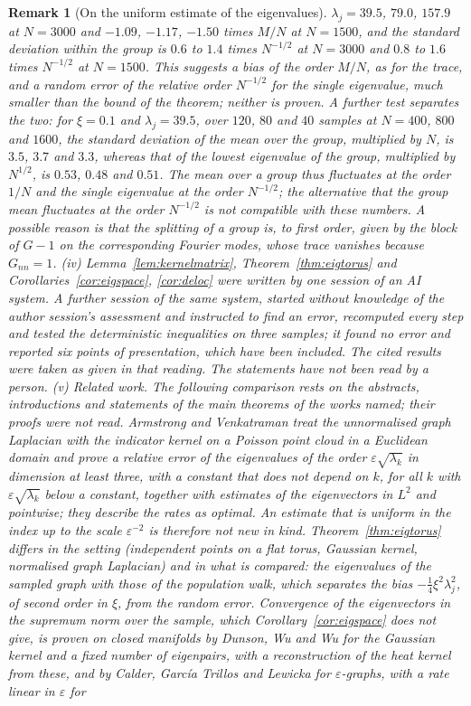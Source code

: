 \documentclass[11pt,a4paper]{article}
\theoremstyle{stmt}
\theoremstyle{defn}
\theoremstyle{rmk}
\newtheorem{remark}[theorem]{Remark}
\numberwithin{equation}{section}
\begin{document}
{\begin{remark}[On the uniform estimate of the eigenvalues]
$\lambda_j=39.5$, $79.0$, $157.9$ at $N=3000$ and $-1.09$, $-1.17$, $-1.50$ times $M/N$ at $N=1500$, and the standard deviation within the group is $0.6$ to $1.4$ times $N^{-1/2}$ at $N=3000$ and $0.8$ to $1.6$ times $N^{-1/2}$ at $N=1500$. This suggests a bias of the order $M/N$, as for the trace, and a random error of the relative order $N^{-1/2}$ for the single eigenvalue, much smaller than the bound of the theorem; neither is proven. A further test separates the two: for $\xi=0.1$ and $\lambda_j=39.5$, over $120$, $80$ and $40$ samples at $N=400$, $800$ and $1600$, the standard deviation of the mean over the group, multiplied by $N$, is $3.5$, $3.7$ and $3.3$, whereas that of the lowest eigenvalue of the group, multiplied by $N^{1/2}$, is $0.53$, $0.48$ and $0.51$. The mean over a group thus fluctuates at the order $1/N$ and the single eigenvalue at the order $N^{-1/2}$; the alternative that the group mean fluctuates at the order $N^{-1/2}$ is not compatible with these numbers. A possible reason is that the splitting of a group is, to first order, given by the block of $G-1$ on the corresponding Fourier modes, whose trace vanishes because $G_{nn}=1$. (iv) Lemma~\ref{lem:kernelmatrix}, Theorem~\ref{thm:eigtorus} and Corollaries~\ref{cor:eigspace}, \ref{cor:deloc} were written by one session of an AI system. A further session of the same system, started without knowledge of the author session's assessment and instructed to find an error, recomputed every step and tested the deterministic inequalities on three samples; it found no error and reported six points of presentation, which have been included. The cited results were taken as given in that reading. The statements have not been read by a person. (v) \emph{Related work.} The following comparison rests on the abstracts, introductions and statements of the main theorems of the works named; their proofs were not read. Armstrong and Venkatraman \cite{ArmstrongVenkatraman} treat the unnormalised graph Laplacian with the indicator kernel on a Poisson point cloud in a Euclidean domain and prove a relative error of the eigenvalues of the order $\varepsilon\sqrt{\lambda_k}$ in dimension at least three, with a constant that does not depend on $k$, for all $k$ with $\varepsilon\sqrt{\lambda_k}$ below a constant, together with estimates of the eigenvectors in $L^2$ and pointwise; they describe the rates as optimal. An estimate that is uniform in the index up to the scale $\varepsilon^{-2}$ is therefore not new in kind. Theorem~\ref{thm:eigtorus} differs in the setting (independent points on a flat torus, Gaussian kernel, normalised graph Laplacian) and in what is compared: the eigenvalues of the sampled graph with those of the population walk, which separates the bias $-\frac14\xi^2\lambda_j^2$, of second order in $\xi$, from the random error. Convergence of the eigenvectors in the supremum norm over the sample, which Corollary~\ref{cor:eigspace} does not give, is proven on closed manifolds by Dunson, Wu and Wu \cite{DunsonWuWu} for the Gaussian kernel and a fixed number of eigenpairs, with a reconstruction of the heat kernel from these, and by Calder, Garc\'ia Trillos and Lewicka \cite{CalderGTL} for $\varepsilon$-graphs, with a rate linear in $\varepsilon$ for 
\end{remark}}
\end{document}

